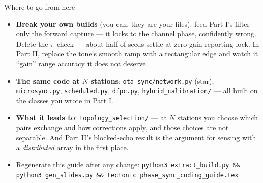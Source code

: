 \documentclass[10pt]{beamer}
\begin{document}
\begin{frame}{Where to go from here}
  \begin{itemize}
    \item \textbf{Break your own builds} (you can, they are your
      files): feed Part I's filter only the forward capture --- it
      locks to the channel phase, confidently wrong. Delete the
      $\pi$ check --- about half of seeds settle at zero gain
      reporting lock. In Part II, replace the tone's smooth ramp
      with a rectangular edge and watch it ``gain'' range accuracy
      it does not deserve.
    \item \textbf{The same code at $N$ stations}:
      \texttt{ota\_sync/network.py} (star), \texttt{microsync.py},
      \texttt{scheduled.py}, \texttt{dfpc.py},
      \texttt{hybrid\_calibration/} --- all built on the classes you
      wrote in Part I.
    \item \textbf{What it leads to}: \texttt{topology\_selection/}
      --- at $N$ stations you choose which pairs exchange and how
      corrections apply, and those choices are not separable. And
      Part II's blocked-echo result is the argument for sensing with
      a \emph{distributed} array in the first place.
    \item Regenerate this guide after any change:
      \texttt{python3 extract\_build.py \&\& python3 gen\_slides.py
      \&\& tectonic phase\_sync\_coding\_guide.tex}
  \end{itemize}
\end{frame}
\end{document}
